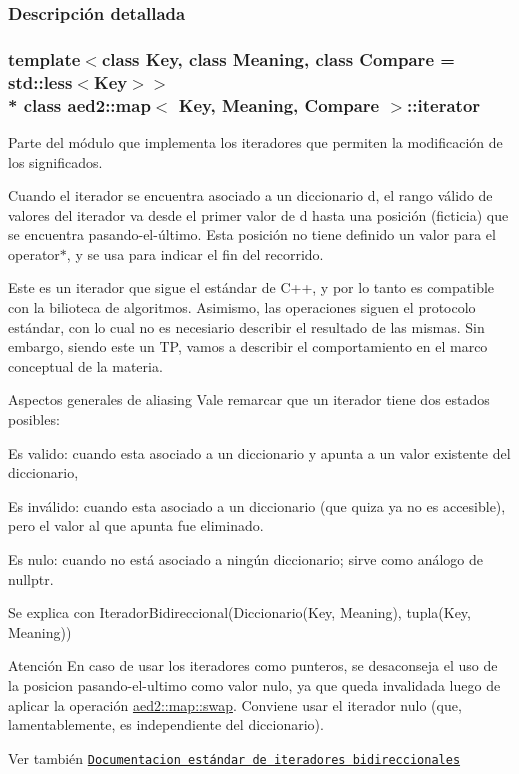 \subsubsection{Descripción detallada}
\subsubsection*{template$<$class Key, class Meaning, class Compare = std\+::less$<$\+Key$>$$>$\\*
class aed2\+::map$<$ Key, Meaning, Compare $>$\+::iterator}

Parte del módulo que implementa los iteradores que permiten la modificación de los significados. 

Cuando el iterador se encuentra asociado a un diccionario {\ttfamily d}, el rango válido de valores del iterador va desde el primer valor de {\ttfamily d} hasta una posición (ficticia) que se encuentra pasando-\/el-\/último. Esta posición no tiene definido un valor para el {\ttfamily operator$\ast$}, y se usa para indicar el fin del recorrido.

Este es un iterador que sigue el estándar de C++, y por lo tanto es compatible con la bilioteca de algoritmos. Asimismo, las operaciones siguen el protocolo estándar, con lo cual no es necesiario describir el resultado de las mismas. Sin embargo, siendo este un TP, vamos a describir el comportamiento en el marco conceptual de la materia.

\begin{DoxyParagraph}{Aspectos generales de aliasing}
Vale remarcar que un iterador tiene dos estados posibles\+:
\begin{DoxyEnumerate}
\item Es valido\+: cuando esta asociado a un diccionario y apunta a un valor existente del diccionario,
\item Es inválido\+: cuando esta asociado a un diccionario (que quiza ya no es accesible), pero el valor al que apunta fue eliminado.
\item Es nulo\+: cuando no está asociado a ningún diccionario; sirve como análogo de {\ttfamily nullptr}. 
\end{DoxyEnumerate}
\end{DoxyParagraph}


\begin{DoxyParagraph}{Se explica con}
Iterador\+Bidireccional(Diccionario(Key, Meaning), tupla(Key, Meaning))
\end{DoxyParagraph}
\begin{DoxyAttention}{Atención}
En caso de usar los iteradores como punteros, se desaconseja el uso de la posicion pasando-\/el-\/ultimo como valor nulo, ya que queda invalidada luego de aplicar la operación \hyperlink{classaed2_1_1map_a43ddb71cc91e5c6021a7a1f243d6cc4a_a43ddb71cc91e5c6021a7a1f243d6cc4a}{aed2\+::map\+::swap}. Conviene usar el iterador nulo (que, lamentablemente, es independiente del diccionario).
\end{DoxyAttention}
\begin{DoxySeeAlso}{Ver también}
\href{http://en.cppreference.com/w/cpp/concept/BidirectionalIterator}{\tt Documentacion estándar de iteradores bidireccionales} 
\end{DoxySeeAlso}


